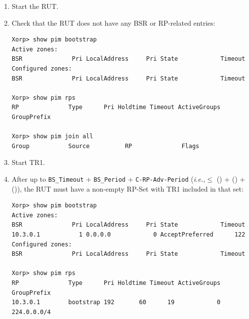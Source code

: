 \documentclass[11pt]{report}
\newcommand{\ie}{\emph{i.e.,}\xspace}
\begin{document}
\begin{enumerate}

  \item Start the RUT.

  \item Check that the RUT does not have any BSR or RP-related entries:

\begin{verbatim}
Xorp> show pim bootstrap
Active zones:
BSR              Pri LocalAddress     Pri State            Timeout
Configured zones:
BSR              Pri LocalAddress     Pri State            Timeout

Xorp> show pim rps
RP              Type      Pri Holdtime Timeout ActiveGroups GroupPrefix

Xorp> show pim join all
Group           Source          RP              Flags

\end{verbatim}

  \item Start TR1.

  \item After up to \verb=BS_Timeout= + \verb=BS_Period= +
        \verb=C-RP-Adv-Period=
        (\ie $\leq$ ({\PimsmBSTimeout}) + ({\PimsmBSTimeout}) +
        ({\PimsmCRPAdvPeriod})), the RUT must have a non-empty RP-Set
        with TR1 included in that set:

\begin{verbatim}
Xorp> show pim bootstrap
Active zones:
BSR              Pri LocalAddress     Pri State            Timeout
10.3.0.1           1 0.0.0.0            0 AcceptPreferred      122
Configured zones:
BSR              Pri LocalAddress     Pri State            Timeout

Xorp> show pim rps
RP              Type      Pri Holdtime Timeout ActiveGroups GroupPrefix
10.3.0.1        bootstrap 192       60      19            0 224.0.0.0/4


\end{verbatim}
\end{enumerate}
\end{document}
